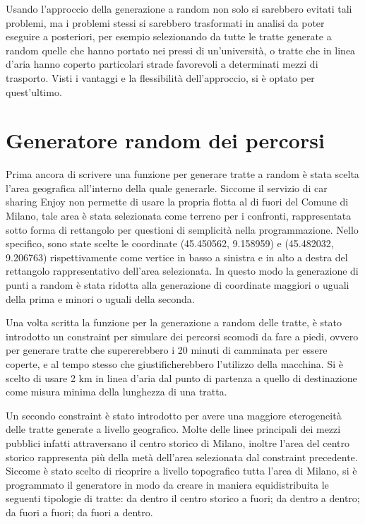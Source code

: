 Usando l'approccio della generazione a random non solo si sarebbero evitati tali problemi, ma i problemi stessi si sarebbero trasformati in analisi da poter eseguire a posteriori, per esempio selezionando da tutte le tratte generate a random quelle che hanno portato nei pressi di un'università, o tratte che in linea d'aria hanno coperto particolari strade favorevoli a determinati mezzi di trasporto. Visti i vantaggi e la flessibilità dell'approccio, si è optato per quest'ultimo.

\section{Generatore random dei percorsi}

Prima ancora di scrivere una funzione per generare tratte a random è stata scelta l'area geografica all'interno della quale generarle. Siccome il servizio di car sharing Enjoy non permette di usare la propria flotta al di fuori del Comune di Milano, tale area è stata selezionata come terreno per i confronti, rappresentata sotto forma di rettangolo per questioni di semplicità nella programmazione. Nello specifico, sono state scelte le coordinate (45.450562\textdegree, 9.158959\textdegree) e (45.482032\textdegree, 9.206763\textdegree) rispettivamente come vertice in basso a sinistra e in alto a destra del rettangolo rappresentativo dell'area selezionata. In questo modo la generazione di punti a random è stata ridotta alla generazione di coordinate maggiori o uguali della prima e minori o uguali della seconda.

Una volta scritta la funzione per la generazione a random delle tratte, è stato introdotto un constraint per simulare dei percorsi scomodi da fare a piedi, ovvero per generare tratte che supererebbero i 20 minuti di camminata per essere coperte, e al tempo stesso che giustificherebbero l'utilizzo della macchina. Si è scelto di usare 2 km in linea d'aria dal punto di partenza a quello di destinazione come misura minima della lunghezza di una tratta.

Un secondo constraint è stato introdotto per avere una maggiore eterogeneità delle tratte generate a livello geografico. Molte delle linee principali dei mezzi pubblici infatti attraversano il centro storico di Milano, inoltre l'area del centro storico rappresenta più della metà dell'area selezionata dal constraint precedente. Siccome è stato scelto di ricoprire a livello topografico tutta l'area di Milano, si è programmato il generatore in modo da creare in maniera equidistribuita le seguenti tipologie di tratte: da dentro il centro storico a fuori; da dentro a dentro; da fuori a fuori; da fuori a dentro.

